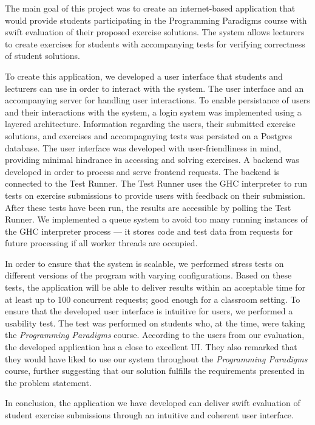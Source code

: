 The main goal of this project was to create an internet-based application that would provide students participating in the Programming Paradigms course with swift evaluation of their proposed exercise solutions.
The system allows lecturers to create exercises for students with accompanying tests for verifying correctness of student solutions.

To create this application, we developed a user interface that students and lecturers can use in order to interact with the system. The user interface and an accompanying server for handling user interactions.
To enable persistance of users and their interactions with the system, a login system was implemented using a layered architecture.
Information regarding the users, their submitted exercise solutions, and exercises and accompagnying tests was persisted on a Postgres database.
The user interface was developed with user-friendliness in mind, providing minimal hindrance in accessing and solving exercises.
A backend was developed in order to process and serve frontend requests.
The backend is connected to the Test Runner. The Test Runner uses the GHC interpreter to run tests on exercise submissions to provide users with feedback on their submission.
After these tests have been run, the results are accessible by polling the Test Runner.
We implemented a queue system to avoid too many running instances of the GHC interpreter process --- it stores code and test data from requests for future processing if all worker threads are occupied.

In order to ensure that the system is scalable, we performed stress tests on different versions of the program with varying configurations.
Based on these tests, the application will be able to deliver results within an acceptable time for at least up to 100 concurrent requests; good enough for a classroom setting.
To ensure that the developed user interface is intuitive for users, we performed a usability test.
The test was performed on students who, at the time, were taking the \textit{Programming Paradigms} course.
According to the users from our evaluation, the developed application has a close to excellent UI.
They also remarked that they would have liked to use our system throughout the \textit{Programming Paradigms} course, further suggesting that our solution fulfills the requirements presented in the problem statement.

In conclusion, the application we have developed can deliver swift evaluation of student exercise submissions through an intuitive and coherent user interface.